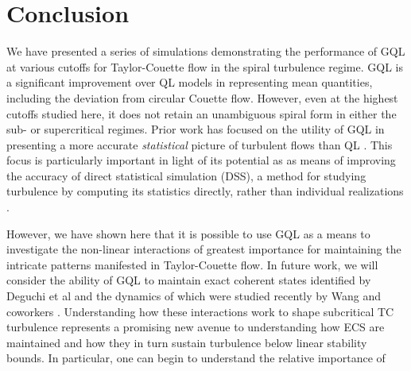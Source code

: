 \documentclass[openacc]{rstransa}%
\begin{document}
\section{Conclusion}
\label{sec:conclusion}
We have presented a series of simulations demonstrating the performance of GQL at various cutoffs for Taylor-Couette flow in the spiral turbulence regime. GQL is a significant improvement over QL models in representing mean quantities, including the deviation from circular Couette flow. However, even at the highest cutoffs studied here, it does not retain an unambiguous spiral form in either the sub- or supercritical regimes. Prior work has focused on the utility of GQL in presenting a more accurate \emph{statistical} picture of turbulent flows than QL \cite{2016PhRvL.116u4501M, 2017JFM...810..412T,2018RSPSA.47480422T,2019Kellam}. This focus is particularly important in light of its potential as as means of improving the accuracy of direct statistical simulation (DSS), a method for studying turbulence by computing its statistics directly, rather than individual realizations \cite{2022arXiv220505513M}. 

However, we have shown here that it is possible to use GQL as a means to investigate the non-linear interactions of greatest importance for maintaining the intricate patterns manifested in Taylor-Couette flow. In future work, we will consider the ability of GQL to maintain exact coherent states identified by Deguchi et al \cite{2014PhRvL.112r4502D} and the dynamics of which were studied recently by Wang and coworkers \cite{2022arXiv220712990W}. Understanding how these interactions work to shape subcritical TC turbulence represents a promising new avenue to understanding how ECS are maintained and how they in turn sustain turbulence below linear stability bounds. In particular, one can begin to understand the relative importance of 


\end{document}
